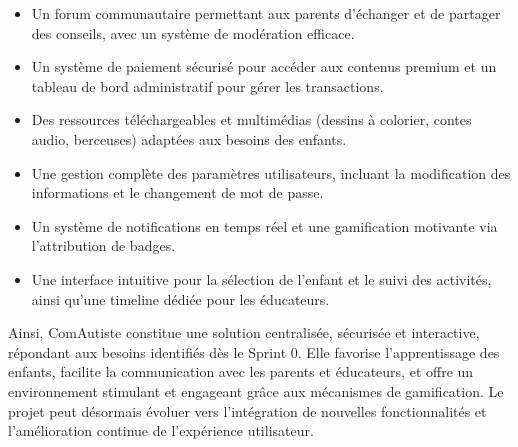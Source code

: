 \documentclass[12pt,a4paper]{report}
\begin{document}
\begin{itemize}
\item Un forum communautaire permettant aux parents d’échanger et de partager des conseils, avec un système de modération efficace.
\item Un système de paiement sécurisé pour accéder aux contenus premium et un tableau de bord administratif pour gérer les transactions.
\item Des ressources téléchargeables et multimédias (dessins à colorier, contes audio, berceuses) adaptées aux besoins des enfants.
\item Une gestion complète des paramètres utilisateurs, incluant la modification des informations et le changement de mot de passe.
\item Un système de notifications en temps réel et une gamification motivante via l’attribution de badges.
\item Une interface intuitive pour la sélection de l’enfant et le suivi des activités, ainsi qu’une timeline dédiée pour les éducateurs.
\end{itemize}

Ainsi, ComAutiste constitue une solution centralisée, sécurisée et interactive, répondant aux besoins identifiés dès le Sprint 0. Elle favorise l’apprentissage des enfants, facilite la communication avec les parents et éducateurs, et offre un environnement stimulant et engageant grâce aux mécanismes de gamification. Le projet peut désormais évoluer vers l’intégration de nouvelles fonctionnalités et l’amélioration continue de l’expérience utilisateur.
\end{document}
